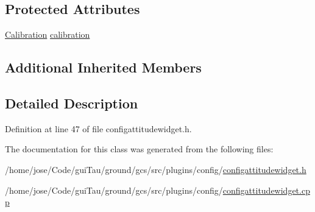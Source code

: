 \subsection*{Protected Attributes}
\begin{DoxyCompactItemize}
\item 
\hyperlink{class_calibration}{Calibration} \hyperlink{group___config_plugin_ga4b85d588b6292a6f8755725ccca770fb}{calibration}
\end{DoxyCompactItemize}
\subsection*{Additional Inherited Members}


\subsection{Detailed Description}


Definition at line 47 of file configattitudewidget.\-h.



The documentation for this class was generated from the following files\-:\begin{DoxyCompactItemize}
\item 
/home/jose/\-Code/gui\-Tau/ground/gcs/src/plugins/config/\hyperlink{configattitudewidget_8h}{configattitudewidget.\-h}\item 
/home/jose/\-Code/gui\-Tau/ground/gcs/src/plugins/config/\hyperlink{configattitudewidget_8cpp}{configattitudewidget.\-cpp}\end{DoxyCompactItemize}
